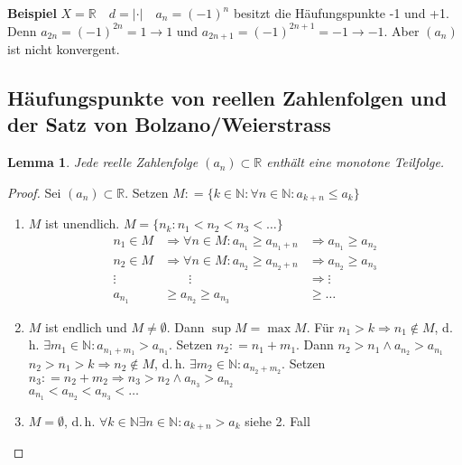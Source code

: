 \documentclass[ngerman,titlepage,twoside, parskip=half*]{scrreprt}
\newcommand*{\N}{\mathbb{N}}
\newcommand*{\R}{\mathbb{R}}
\theoremstyle{plain}
\newtheorem{lemma}{Lemma}
\theoremstyle{definition}
\theoremstyle{remark}
\newcommand*{\abs}[2][]{#1\lvert#2#1\rvert}
\newcommand*{\coloneqq}{\mathrel{\mathop:}=}
\begin{document}
\textbf{Beispiel} $X=\R \quad d=\abs{\cdot} \quad a_n=(-1)^n$ besitzt die Häufungspunkte -1 und +1. Denn $a_{2n}=(-1)^{2n}
=1\rightarrow 1$ und $a_{2n+1}=(-1)^{2n+1}=-1\rightarrow -1$. Aber $(a_n)$ ist nicht konvergent.

\subsection[Häufungspunkte von reellen Zahlenfolgen\texorpdfstring{\\}{} und der Satz von Bolzano/Weierstrass]{Häufungspunkte von reellen Zahlenfolgen und der Satz von Bolzano/Weierstrass}
\begin{lemma}
\label{lemma:bw}
Jede reelle Zahlenfolge $(a_n) \subset \R$ enthält eine monotone Teilfolge.
\end{lemma}
\begin{proof}
  Sei $(a_n) \subset \R$. Setzen $M\coloneqq\{k \in \N \colon \forall n \in \N
  \colon a_{k+n}\leq a_k\}$
  \begin{enumerate}[1. F{a}ll]
  \item $M$ ist unendlich. $M=\{n_k\colon n_1<n_2<n_3<\ldots\}$
    \begin{align*}
      n_1 \in M & \Rightarrow \forall n \in M\colon a_{n_1}\geq a_{n_1+n} &
      \Rightarrow a_{n_1} \geq a_{n_2}\\
      n_2 \in M & \Rightarrow \forall n \in M\colon a_{n_2}\geq a_{n_2+n} &
      \Rightarrow a_{n_2} \geq a_{n_3}\\
      \vdots &\qquad \vdots & \Rightarrow \vdots\\
      a_{n_1} &\geq a_{n_2}\geq a_{n_3} &\geq \ldots
    \end{align*}
  \item $M$ ist endlich und $M \neq \emptyset$. Dann $\sup M = \max
    M$. Für $n_1>k \Rightarrow n_1 \notin M$, d.\,h.
    $\exists m_1 \in \N \colon a_{n_1+m_1}>a_{n_1}$. Setzen $n_2 \coloneqq n_1
    +m_1$. Dann $n_2>n_1 \wedge a_{n_2} > a_{n_1}$\\
    $n_2>n_1>k \Rightarrow n_2 \notin M$, d.\,h. $\exists m_2 \in \N \colon
    a_{n_2+m_2}$. Setzen $n_3\coloneqq n_2+m_2 \Rightarrow
    n_3>n_2 \wedge a_{n_3}>a_{n_2}$\\
    $a_{n_1}<a_{n_2}<a_{n_3}<\ldots$
  \item $M=\emptyset$, d.\,h. $\forall k \in \N \exists n \in \N \colon
    a_{k+n}>a_k$ siehe 2. Fall
\end{enumerate}
\end{proof}
\end{document}
